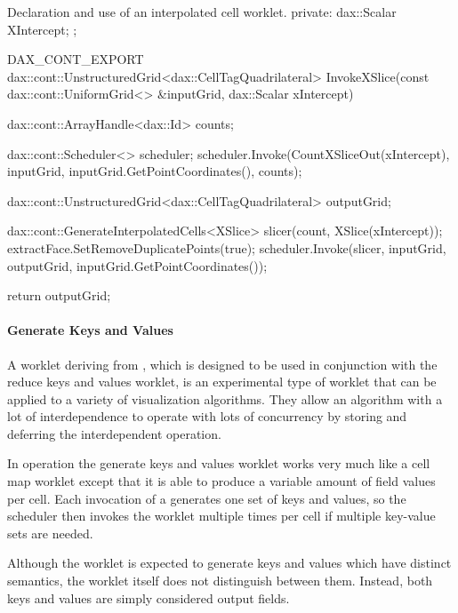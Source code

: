 \begin{daxexample}{Declaration and use of an interpolated cell worklet.}
{private:
  dax::Scalar XIntercept;
};

DAX_CONT_EXPORT
dax::cont::UnstructuredGrid<dax::CellTagQuadrilateral>
InvokeXSlice(const dax::cont::UniformGrid<> &inputGrid, dax::Scalar xIntercept)
{
  dax::cont::ArrayHandle<dax::Id> counts;

  dax::cont::Scheduler<> scheduler;
  scheduler.Invoke(CountXSliceOut(xIntercept),
                   inputGrid,
                   inputGrid.GetPointCoordinates(),
                   counts);

  dax::cont::UnstructuredGrid<dax::CellTagQuadrilateral> outputGrid;

  dax::cont::GenerateInterpolatedCells<XSlice> slicer(count, XSlice(xIntercept));
  extractFace.SetRemoveDuplicatePoints(true);
  scheduler.Invoke(slicer, inputGrid, outputGrid, inputGrid.GetPointCoordinates());

  return outputGrid;
}
\end{daxexample}


\paragraph{Generate Keys and Values}


A worklet deriving from , which is
designed to be used in conjunction with the reduce keys and values worklet,
is an experimental type of worklet that can be applied to a variety of
visualization algorithms. They allow an algorithm with a lot of
interdependence to operate with lots of concurrency by storing and
deferring the interdependent operation.

In operation the generate keys and values worklet works very much like a
cell map worklet except that it is able to produce a variable amount of
field values per cell. Each invocation of a
 generates one set of keys and values,
so the scheduler then invokes the worklet multiple times per cell if
multiple key-value sets are needed.

Although the  worklet is expected to
generate keys and values which have distinct semantics, the worklet itself
does not distinguish between them. Instead, both keys and values are simply
considered output fields.

